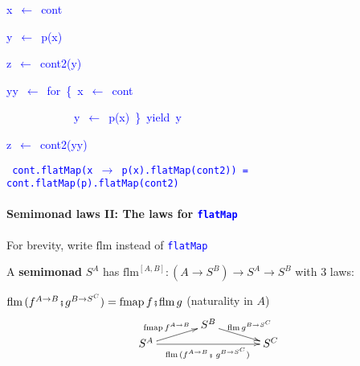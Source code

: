 \texttt{\textcolor{blue}{\footnotesize{}}}%
\begin{minipage}[c][1\totalheight][t]{0.49\columnwidth}%
\begin{lyxcode}
\textcolor{blue}{\footnotesize{}x~$\leftarrow$~cont}{\footnotesize\par}

\textcolor{blue}{\footnotesize{}y~$\leftarrow$~p(x)}{\footnotesize\par}

\textcolor{blue}{\footnotesize{}z~$\leftarrow$~cont2(y)}{\footnotesize\par}
\end{lyxcode}
%
\end{minipage}\texttt{\textcolor{blue}{\footnotesize{}\hfill{}}}%
\begin{minipage}[c][1\totalheight][t]{0.49\columnwidth}%
\begin{lyxcode}
\textcolor{blue}{\footnotesize{}yy~$\leftarrow$~for~\{~x~$\leftarrow$~cont}{\footnotesize\par}

\textcolor{blue}{\footnotesize{}~~~~~~~~~~~~y~$\leftarrow$~p(x)~\}~yield~y}{\footnotesize\par}

\textcolor{blue}{\footnotesize{}z~$\leftarrow$~cont2(yy)}{\footnotesize\par}
\end{lyxcode}
%
\end{minipage}\texttt{\textcolor{blue}{\footnotesize{}\hfill{}\medskip{}
cont.flatMap(x $\rightarrow$ p(x).flatMap(cont2)) = cont.flatMap(p).flatMap(cont2)}} 


\paragraph{Semimonad laws II: The laws for \texttt{\textcolor{blue}{\footnotesize{}flatMap}} }

For brevity, write {\footnotesize{}$\text{flm}$} instead of \texttt{\textcolor{blue}{\footnotesize{}flatMap}} 

A \textbf{semimonad} $S^{A}$ has {\footnotesize{}$\text{flm}^{\left[A,B\right]}:\left(A\rightarrow S^{B}\right)\rightarrow S^{A}\rightarrow S^{B}$}
with 3 laws:

{\footnotesize{}$\text{flm}\,(f^{A\rightarrow B}\bef g^{B\rightarrow S^{C}})=\text{fmap}\,f\bef\text{flm}\,g$}
{\footnotesize{}(naturality in $A$)} {\footnotesize{}
\[
\xymatrix{\xyScaleY{0.2pc}\xyScaleX{3pc} & S^{B}\ar[rd]\sp(0.5){\ \text{flm}\,g^{B\rightarrow S^{C}}}\\
S^{A}\ar[ru]\sp(0.5){\text{fmap}\,f^{A\rightarrow B}\ }\ar[rr]\sb(0.5){\text{flm}\,(f^{A\rightarrow B}\bef\,g^{B\rightarrow S^{C}})\,} &  & S^{C}
}
\]
}{\footnotesize\par}

